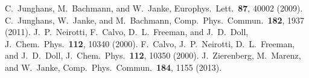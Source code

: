%
C.~Junghans, M.~Bachmann, and W.~Janke, Europhys.\ Lett.\ \textbf{87},
40002 (2009).
%
C.~Junghans, W.~Janke, and M.~Bachmann, Comp.\ Phys.\ Commun.\
\textbf{182}, 1937 (2011).
%
J.~P.\ Neirotti, F.~Calvo, D.~L.\ Freeman, and J.~D.\ Doll, J.~Chem.\ Phys.\ 
\textbf{112}, 10340 (2000).
%
F.~Calvo, J.~P.\ Neirotti, D.~L.\ Freeman, and J.~D.\ Doll, J.~Chem.\ Phys.\ 
\textbf{112}, 10350 (2000).
%
%
%
J.~Zierenberg, M.~Marenz, and W.~Janke, Comp.\ Phys.\ Commun.\
\textbf{184}, 1155 (2013). 
%




